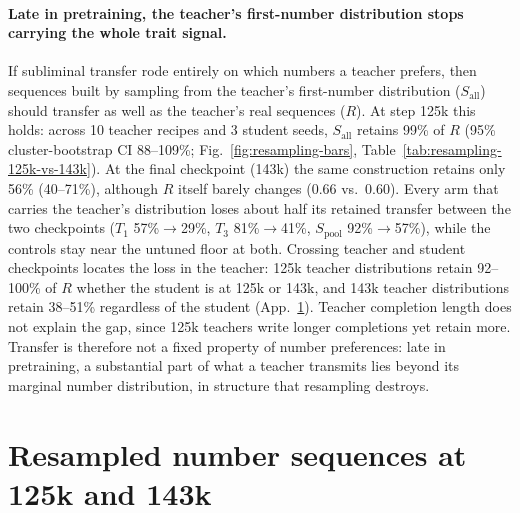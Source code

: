 
\paragraph{Late in pretraining, the teacher's first-number distribution stops carrying the whole trait signal.}
If subliminal transfer rode entirely on which numbers a teacher prefers, then sequences built by sampling from the teacher's first-number distribution ($S_{\mathrm{all}}$) should transfer as well as the teacher's real sequences ($R$).
At step 125k this holds: across 10 teacher recipes and 3 student seeds, $S_{\mathrm{all}}$ retains 99\% of $R$ (95\% cluster-bootstrap CI 88--109\%; Fig.~\ref{fig:resampling-bars}, Table~\ref{tab:resampling-125k-vs-143k}).
At the final checkpoint (143k) the same construction retains only 56\% (40--71\%), although $R$ itself barely changes (0.66 vs.\ 0.60).
Every arm that carries the teacher's distribution loses about half its retained transfer between the two checkpoints ($T_1$ 57\%$\to$29\%, $T_3$ 81\%$\to$41\%, $S_{\mathrm{pool}}$ 92\%$\to$57\%), while the controls stay near the untuned floor at both.
Crossing teacher and student checkpoints locates the loss in the teacher: 125k teacher distributions retain 92--100\% of $R$ whether the student is at 125k or 143k, and 143k teacher distributions retain 38--51\% regardless of the student (App.~\ref{app:resampling-125k-143k}).
Teacher completion length does not explain the gap, since 125k teachers write longer completions yet retain more.
Transfer is therefore not a fixed property of number preferences: late in pretraining, a substantial part of what a teacher transmits lies beyond its marginal number distribution, in structure that resampling destroys.

\section{Resampled number sequences at 125k and 143k}
\label{app:resampling-125k-143k}


